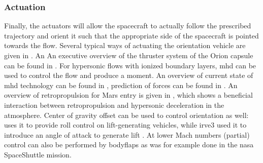 \subsubsection{Actuation}
Finally, the actuators will allow the spacecraft to actually follow the prescribed trajectory and orient it such that the appropriate side of the spacecraft is pointed towards the flow. Several typical ways of actuating the orientation vehicle are given in \cite{Wertz2011}. An An executive overview of the thruster system of the Orion capsule can be found in \cite{Jones2012}. For hypersonic flows with ionized boundary layers, \gls{mhd} can be used to control the flow and produce a moment. An overview of current state of \gls{mhd} technology can be found in \cite{Braun2009}, prediction of forces can be found in \cite{Kawamura2013}. An overview of retropropulsion for Mars entry is given in \cite{Korzun2009}, which shows a beneficial interaction between retropropulsion and hypersonic deceleration in the atmosphere. Center of gravity offset can be used to control orientation as well: \cite{Petsopoulos1996} uses it to provide roll control on lift-generating vehicles, while \gls{irve3} used it to introduce an angle of attack to generate lift \cite{Dillman2012a}. At lower Mach numbers (partial) control can also be performed by bodyflaps as was for example done in the \gls{nasa} SpaceShuttle mission.